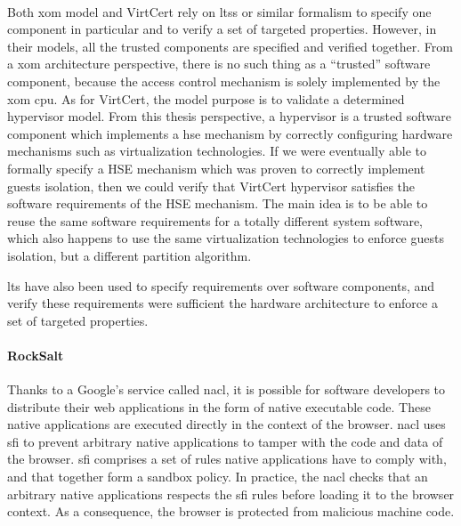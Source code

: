 \paragraph{}
%
Both \ac{xom} model and VirtCert rely on \acp{lts} or similar formalism to
specify one component in particular and to verify a set of targeted properties.
%
However, in their models, all the trusted components are specified and verified
together.
%
From a \ac{xom} architecture perspective, there is no such thing as a
``trusted'' software component, because the access control mechanism is solely
implemented by the \ac{xom} \ac{cpu}.
%
As for VirtCert, the model purpose is to validate a determined hypervisor model.
%
From this thesis perspective, a hypervisor is a trusted software component which
implements a \ac{hse} mechanism by correctly configuring hardware mechanisms
such as virtualization technologies.
%
If we were eventually able to formally specify a HSE mechanism which was proven
to correctly implement guests isolation, then we could verify that VirtCert
hypervisor satisfies the software requirements of the HSE mechanism.
%
The main idea is to be able to reuse the same software requirements for a
totally different system software, which also happens to use the same
virtualization technologies to enforce guests isolation, but a different
partition algorithm.

\ac{lts} have also been used to specify requirements over software components,
and verify these requirements were sufficient the hardware architecture to
enforce a set of targeted properties.

\paragraph{RockSalt}
%
Thanks to a Google's service called \ac{nacl}, it is possible for software
developers to distribute their web applications in the form of native executable
code.
%
These native applications are executed directly in the context of the browser.
%
\ac{nacl} uses \ac{sfi} to prevent arbitrary native applications to tamper with
the code and data of the browser.
%
\ac{sfi} comprises a set of rules native applications have to comply with, and
that together form a sandbox policy.
%
In practice, the \ac{nacl} checks that an arbitrary native applications respects
the \ac{sfi} rules before loading it to the browser context.
%
As a consequence, the browser is protected from malicious machine code.

